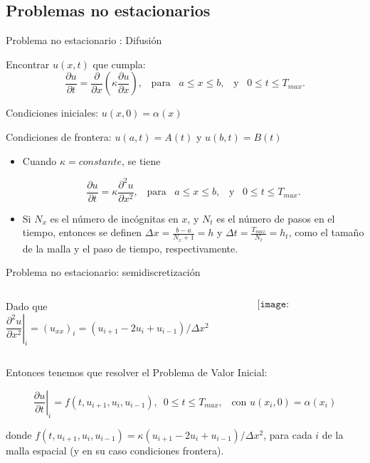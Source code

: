 \documentclass[handout]{beamer}
\begin{document}
\subsection{Problemas no estacionarios}

\begin{frame}{Problema no estacionario : Difusi\'on}

Encontrar $u(x,t)$ que cumpla:
\[
\frac{\partial u}{\partial t} = \frac{\partial}{\partial x} \left( \kappa \frac{\partial u}{\partial x} \right),
\,\,\, \text{ para } \,\,\, a \leq x \leq b, \,\,\, \text{ y } \,\,\, 0 \leq t \leq T_{max}.
\]

Condiciones iniciales: $u(x,0) = \alpha(x)$

Condiciones de frontera: $u(a,t)=A(t)$ y $u(b,t)=B(t)$

\pause

\begin{itemize}[<+->]
\item Cuando $\kappa = constante$, se tiene

\[
\frac{\partial u}{\partial t} = \kappa \frac{\partial^2 u}{\partial x^2},
\,\,\, \text{ para } \,\,\, a \leq x \leq b, \,\,\, \text{ y } \,\,\, 0 \leq t \leq T_{max}.
\]

\item Si $N_x$ es el n\'umero de inc\'ognitas en $x$, y $N_t$ es el n\'umero de pasos en el tiempo, entonces se definen
$\displaystyle \Delta x = \frac{b-a}{N_x + 1} = h$ y $\displaystyle \Delta t = \frac{T_{max}}{N_t} = h_t$, como el tama\~no de la malla y el paso de tiempo, respectivamente.
\end{itemize}

\end{frame}

\begin{frame}{Problema no estacionario: semidiscretizaci\'on}

\begin{columns}
\begin{column}{0.65\textwidth}
{\small Dado que
$\left.\dfrac{\partial^2 u}{\partial x^2}\right|_i =
(u_{xx})_i = (u_{i+1} - 2 u_{i} + u_{i-1})/\Delta x^2$ 
}
\end{column}
\begin{column}{0.35\textwidth}
$$\texttt{[image: Stencil1D\_DF\_01]}$$
\end{column}
\end{columns}

\pause

Entonces tenemos que resolver el Problema de Valor Inicial:

\[
\boxed{\left.\frac{\partial u}{\partial t}\right|_i = f(t, u_{i+1}, u_{i}, u_{i-1}), \,\,\, 0 \leq t \leq T_{max}, \,\,\, \text{ con } u(x_i, 0) = \alpha(x_i)}
\]

donde $f(t, u_{i+1}, u_{i}, u_{i-1}) = \kappa (u_{i+1} - 2 u_{i} + u_{i-1}) / \Delta x^2$, para cada $i$ de la malla espacial (y en su caso condiciones frontera).

\end{frame}
\end{document}
